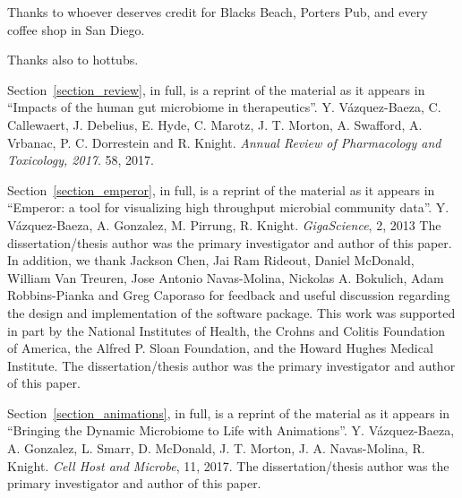 \begin{frontmatter}
\printglossary[title=List of Abbreviations,toctitle=List of Abbreviations,nonumberlist ]
\listoffigures  %
\listoftables   %

%
%
\begin{acknowledgements} 
 Thanks to whoever deserves credit for Blacks Beach, Porters Pub, and
 every coffee shop in San Diego. 

 Thanks also to hottubs.

    Section~\ref{section_review}, in full, is a reprint of the material as it 
    appears in ``Impacts of the human gut microbiome in therapeutics''. Y.  
    V\'azquez-Baeza, C. Callewaert, J. Debelius, E. Hyde, C.  Marotz, J. T.  
    Morton, A. Swafford, A. Vrbanac, P. C.  Dorrestein and R.  Knight.  
    \emph{Annual Review of Pharmacology and Toxicology, 2017}. 58, 2017.

    Section~\ref{section_emperor}, in full, is a reprint of the material as it 
    appears in ``Emperor: a tool for visualizing high throughput microbial 
    community data''. Y. V\'azquez-Baeza, A. Gonzalez, M. Pirrung, R.  Knight.  
    \emph{GigaScience}, 2, 2013 The dissertation/thesis author was the primary 
    investigator and author of this paper. In addition, we thank Jackson Chen, 
    Jai Ram Rideout, Daniel McDonald, William Van Treuren, Jose Antonio 
    Navas\hyp{}Molina, Nickolas A. Bokulich, Adam Robbins\hyp{}Pianka and Greg 
    Caporaso for feedback and useful discussion regarding the design and 
    implementation of the software package. This work was supported in part by 
    the National Institutes of Health, the Crohns and Colitis Foundation of 
    America, the Alfred P. Sloan Foundation, and the Howard Hughes Medical 
    Institute. The dissertation/thesis author was the primary investigator and 
    author of this paper.

    Section~\ref{section_animations}, in full, is a reprint of the material as 
    it appears in ``Bringing the Dynamic Microbiome to Life with Animations''.  
    Y.  V\'azquez-Baeza, A. Gonzalez, L. Smarr, D.  McDonald, J.  T. Morton, J.  
    A.  Navas-Molina, R. Knight. \emph{Cell Host and Microbe}, 11, 2017. The 
    dissertation/thesis author was the primary investigator and author of this 
    paper.


\end{acknowledgements}
\end{frontmatter}
